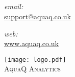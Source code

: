 \title{\mytitle}
\author{AquaQ Analytics}
\date{}

\begin{titlepage}

\begin{center}

\vspace {3.0cm}
\textsc{\seriestitle}\\[0.5cm]
\date{}
\HRule \\[0.7cm]
{ \huge \bf \mytitle}\\[0.4cm]

\HRule \\[1.5cm]

\begin{minipage}{0.4\textwidth}
\begin{flushleft} \large
\emph{email:}\\
\href{mailto:support@aquaq.co.uk}{support@aquaq.co.uk}
\end{flushleft}
\end{minipage}
\begin{minipage}{0.4\textwidth}
\begin{flushright} \large
\emph{web:}\\
\url{www.aquaq.co.uk}
\end{flushright}
\end{minipage}

\vspace {3.0cm}

\texttt{[image: logo.pdf]}\\[1cm]

\textsc{ \huge{AquaQ} Analytics}\\[1.5cm]

\end{center}
\end{titlepage}
